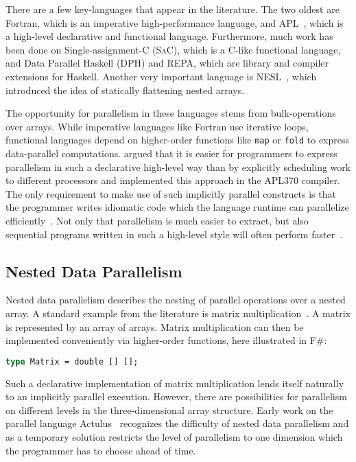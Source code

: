 \documentclass[a4paper]{article}
\newcommand{\sac}{S\textsc{a}C}
\begin{document}
There are a few key-languages that appear in the literature. The two
oldest are Fortran, which is an imperative
high-performance language, and APL~\cite{Iverson1962Programming},
which is a high-level declarative and functional
language. Furthermore, much work has been done on Single-assignment-C
(\sac{}), which is a C-like functional language, and Data
Parallel Haskell (DPH) and REPA, which are library and
compiler extensions for Haskell. Another very important language is
NESL~\cite{Blelloch1993NESL}, which introduced the idea of statically
flattening nested arrays.

The opportunity for parallelism in these languages stems from
bulk-operations over arrays. While imperative languages like Fortran
use iterative loops, functional languages depend on higher-order
functions like \texttt{map} or \texttt{fold} to express data-parallel
computations. \citet{Ching:1990:APA:97808.97826} argued that it is
easier for programmers to express parallelism in such a declarative
high-level way than by explicitly scheduling work to different
processors and implemented this approach in the APL370 compiler. The
only requirement to make use of such implicitly parallel constructs is
that the programmer writes idiomatic code which the language runtime
can parallelize
efficiently~\cite{Bernecky:2015:AEP:2774959.2774962}. Not only that
parallelism is much easier to extract, but also sequential programs
written in such a high-level style will often perform
faster~\cite{Bernecky:2015:AEP:2774959.2774962}.

\subsection{Nested Data Parallelism}
\label{sec:nest-data-parall}

Nested data parallelism describes the nesting of parallel operations
over a nested array. A standard example from the literature is matrix
multiplication~\cite{Keller:2010:RSP:1863543.1863582}. A matrix is
represented by an array of arrays. Matrix multiplication can then be
implemented conveniently via higher-order functions, here illustrated
in F\#:

\begin{lstlisting}[language=ML]
type Matrix = double [] [];
\end{lstlisting}

Such a declarative implementation of matrix multiplication lends
itself naturally to an implicitly parallel execution. However, there
are possibilities for parallelism on different levels in the
three-dimensional array structure. Early work on the parallel language
Actulus~\cite{Perrott:1979:LAV:357073.357075} recognizes the
difficulty of nested data parallelism and as a temporary solution
restricts the level of parallelism to one dimension which the
programmer has to choose ahead of time.
\end{document}
